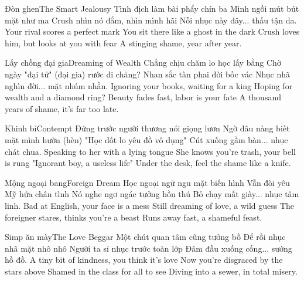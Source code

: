 \begin{tutuyetbox}{Đòn ghen}{The Smart Jealousy}
Tình địch làm bài phẩy chín ba
Mình ngồi mút bút mặt như ma
Crush nhìn nó đắm, nhìn mình hãi
Nỗi nhục này đây... thấu tận da.
\tcblower
Your rival scores a perfect mark
You sit there like a ghost in the dark
Crush loves him, but looks at you with fear
A stinging shame, year after year.
\end{tutuyetbox}

\begin{tutuyetbox}{Lấy chồng đại gia}{Dreaming of Wealth}
Chẳng chịu chăm lo học lấy bằng
Chờ ngày "đại tử" (đại gia) rước đi chăng?
Nhan sắc tàn phai đời bốc vác
Nhục nhã nghìn đời... mặt nhúm nhằn.
\tcblower
Ignoring your books, waiting for a king
Hoping for wealth and a diamond ring?
Beauty fades fast, labor is your fate
A thousand years of shame, it's far too late.
\end{tutuyetbox}

\begin{tutuyetbox}{Khinh bỉ}{Contempt}
Đứng trước người thương nói giọng lươn
Ngờ đâu nàng biết mặt mình hườn (hèn)
"Học dốt lo yêu đồ vô dụng"
Cút xuống gầm bàn... nhục chát chua.
\tcblower
Speaking to her with a lying tongue
She knows you're trash, your bell is rung
"Ignorant boy, a useless life"
Under the desk, feel the shame like a knife.
\end{tutuyetbox}

\begin{tutuyetbox}{Mộng ngoại bang}{Foreign Dream}
Học ngoại ngữ ngu mặt biến hình
Vẫn đòi yêu Mỹ hứa chân tình
Nó nghe ngơ ngác tưởng hồn thú
Bỏ chạy mất giày... nhục tâm linh.
\tcblower
Bad at English, your face is a mess
Still dreaming of love, a wild guess
The foreigner stares, thinks you're a beast
Runs away fast, a shameful feast.
\end{tutuyetbox}

\begin{tutuyetbox}{Simp ăn mày}{The Love Beggar}
Một chút quan tâm cũng tưởng bồ
Để rồi nhục nhã mặt nhô nhô
Người ta sỉ nhục trước toàn lớp
Đâm đầu xuống cống... sướng hồ đồ.
\tcblower
A tiny bit of kindness, you think it's love
Now you're disgraced by the stars above
Shamed in the class for all to see
Diving into a sewer, in total misery.
\end{tutuyetbox}

